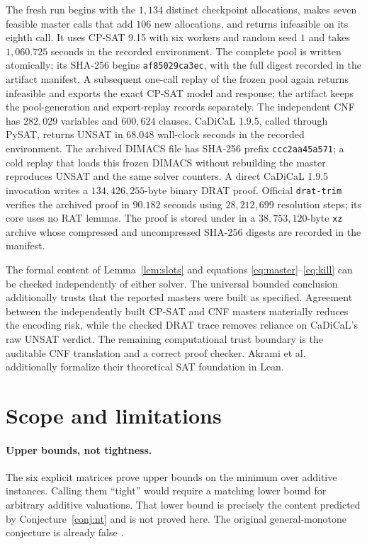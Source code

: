 \documentclass[11pt]{article}
\theoremstyle{plain}
\theoremstyle{definition}
\begin{document}
The fresh run begins with the $1{,}134$ distinct checkpoint allocations, makes
seven feasible master calls that add $106$ new allocations, and returns
infeasible on its eighth call.  It uses CP-SAT 9.15 with six workers and random
seed $1$ and takes $1{,}060.725$ seconds in the recorded environment.  The complete
pool is written atomically; its SHA-256 begins
\texttt{af85029ca3ec}, with the full digest recorded in the artifact manifest.
A subsequent one-call replay of the frozen pool again returns infeasible and
exports the exact CP-SAT model and response; the artifact keeps the
pool-generation and export-replay records separately.  The independent CNF has
$282{,}029$ variables and $600{,}624$ clauses.  CaDiCaL 1.9.5, called through
PySAT, returns UNSAT in $68.048$ wall-clock seconds in the recorded environment.
The archived DIMACS file has SHA-256 prefix \texttt{ccc2aa45a571}; a cold
replay that loads this frozen DIMACS without rebuilding the master reproduces
UNSAT and the same solver counters.  A direct CaDiCaL 1.9.5 invocation writes
a $134{,}426{,}255$-byte binary DRAT proof.  Official \texttt{drat-trim}
verifies the archived proof in $90.182$ seconds using $28{,}212{,}699$
resolution steps; its core uses no RAT lemmas.  The proof is stored under
 in a $38{,}753{,}120$-byte
\texttt{xz} archive whose compressed and uncompressed SHA-256 digests are
recorded in the manifest.

The formal content of Lemma~\ref{lem:slots} and equations
\eqref{eq:master}--\eqref{eq:kill} can be checked independently of either
solver.  The universal bounded conclusion additionally trusts that the
reported masters were built as specified.  Agreement between the independently
built CP-SAT and CNF masters materially reduces the encoding risk, while the
checked DRAT trace removes reliance on CaDiCaL's raw UNSAT verdict.  The
remaining computational trust boundary is the auditable CNF translation and a
correct proof checker.  Akrami et al.\ \cite{Akrami2026SAT} additionally
formalize their theoretical SAT foundation in Lean.

\section{Scope and limitations}

\paragraph{Upper bounds, not tightness.}
The six explicit matrices prove upper bounds on the minimum over additive
instances.  Calling them ``tight'' would require a matching lower bound for
arbitrary additive valuations.  That lower bound is precisely the content
predicted by Conjecture~\ref{conj:nt} and is not proved here.  The original
general-monotone conjecture is already false \cite{Akrami2026SAT}.
\end{document}
